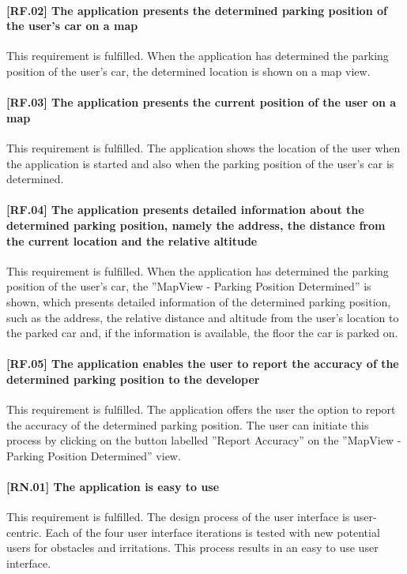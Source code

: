 \paragraph{[RF.02] The application presents the determined parking position of the user's car on a map}
This requirement is fulfilled. When the application has determined the parking position of the user's car, the determined location is shown on a map view.

\paragraph{[RF.03] The application presents the current position of the user on a map}
This requirement is fulfilled. The application shows the location of the user when the application is started and also when the parking position of the user's car is determined.

\paragraph{[RF.04] The application presents detailed information about the determined parking position, namely the address, the distance from the current location and the relative altitude}
This requirement is fulfilled. When the application has determined the parking position of the user's car, the ''MapView - Parking Position Determined'' is shown, which presents detailed information of the determined parking position, such as the address, the relative distance and altitude from the user's location to the parked car and, if the information is available, the floor the car is parked on.

\paragraph{[RF.05] The application enables the user to report the accuracy of the determined parking position to the developer}
This requirement is fulfilled. The application offers the user the option to report the accuracy of the determined parking position. The user can initiate this process by clicking on the button labelled ''Report Accuracy'' on the ''MapView - Parking Position Determined'' view.

\paragraph{[RN.01] The application is easy to use}
This requirement is fulfilled. The design process of the user interface is user-centric. Each of the four user interface iterations is tested with new potential users for obstacles and irritations. This process results in an easy to use user interface.

